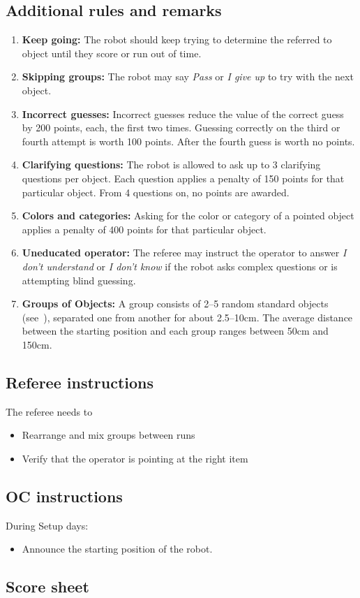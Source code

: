 \subsection*{Additional rules and remarks}
\begin{enumerate}[nosep]
	\item \textbf{Keep going:} The robot should keep trying to determine the referred to object until they score or run out of time.

	\item \textbf{Skipping groups:} The robot may say \emph{Pass} or \emph{I give up} to try with the next object.

	\item \textbf{Incorrect guesses:} Incorrect guesses reduce the value of the correct guess by 200 points, each, the first two times. Guessing correctly on the third or fourth attempt is worth 100 points. After the fourth guess is worth no points.

	\item\textbf{Clarifying questions:} The robot is allowed to ask up to 3 clarifying questions per object. Each question applies a penalty of 150 points for that particular object. From 4 questions on, no points are awarded.

	\item \textbf{Colors and categories:} Asking for the color or category of a pointed object applies a penalty of 400 points for that particular object.

	\item\textbf{Uneducated operator:} The referee may instruct the operator to answer \emph{I don't understand} or \emph{I don't know} if the robot asks complex questions or is attempting blind guessing.

	\item \textbf{Groups of Objects:} A group consists of 2--5 random standard objects (see~), separated one from another for about 2.5--10cm.
	The average distance between the starting position and each group ranges between 50cm and 150cm.

\end{enumerate}

\subsection*{Referee instructions}

The referee needs to
\begin{itemize}[nosep]
	\item Rearrange and mix groups between runs
	\item Verify that the operator is pointing at the right item
\end{itemize}

\subsection*{OC instructions}
During Setup days:
\begin{itemize}[nosep]
	\item Announce the starting position of the robot.
\end{itemize}


\subsection*{Score sheet}



